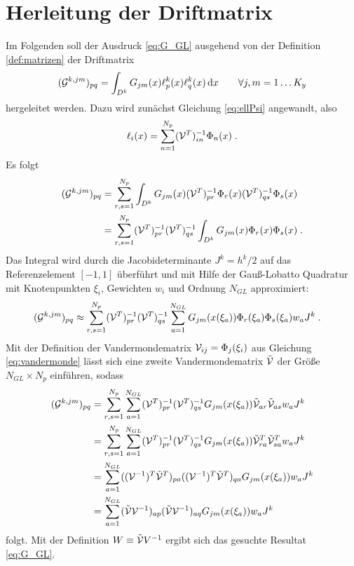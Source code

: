 \section{Herleitung der Driftmatrix}\label{sec:A_5}
Im Folgenden soll der Ausdruck \eqref{eq:G_GL} ausgehend von der Definition \ref{def:matrizen} der Driftmatrix
\begin{equation*}
  (\drift^{k,jm})_{pq} = \int_{D^k} G_{jm}(x) \ell_p^k(x) \ell_q^k(x) \diff x \qquad \forall j,m=1\dots K_y %
\end{equation*}
hergeleitet werden. Dazu wird zunächst Gleichung \eqref{eq:ellPsi} angewandt, also
\begin{equation*}
  \ell_i(x) = \sum_{n=1}^{N_p} (\mathcal{V}^T)^{-1}_{in}\Phi_n(x) \; .
\end{equation*}
Es folgt
\begin{align*}
    (\mathcal{G}^{k,jm})_{pq} &= \sum_{r,s=1}^{N_p}\int_{D^k} G_{jm}(x) (\mathcal{V}^T)^{-1}_{pr}\Phi_r(x) (\mathcal{V}^T)^{-1}_{qs}\Phi_s(x) \\
     &= \sum_{r,s=1}^{N_p} (\mathcal{V}^T)^{-1}_{pr} (\mathcal{V}^T)^{-1}_{qs}  \int_{D^k} G_{jm}(x) \Phi_r(x) \Phi_s(x) \; .
\end{align*}
Das Integral wird durch die Jacobideterminante $J^k=h^k/2$ auf das Referenzelement $[-1,1]$ überführt und mit Hilfe der Gauß-Lobatto Quadratur mit Knotenpunkten $\xi_i$, Gewichten $w_i$ und Ordnung $N_{GL}$ approximiert:
\begin{align*}
    (\mathcal{G}^{k,jm})_{pq} &\approx \sum_{r,s=1}^{N_p} (\mathcal{V}^T)^{-1}_{pr} (\mathcal{V}^T)^{-1}_{qs}  \sum_{a=1}^{N_{GL}} G_{jm}(x(\xi_a)) \Phi_r(\xi_a) \Phi_s(\xi_a) w_a J^k\; .
\end{align*}
Mit der Definition der Vandermondematrix $\mathcal{V}_{ij}=\Phi_j(\xi_i)$ aus Gleichung \eqref{eq:vandermonde} lässt sich eine zweite Vandermondematrix $\tilde{\mathcal{V}}$ der Größe $N_{GL}\times N_p$ einführen, sodass
\begin{align*}
  (\mathcal{G}^{k,jm})_{pq} &= \sum_{r,s=1}^{N_p}\sum_{a=1}^{N_{GL}} (\mathcal{V}^T)^{-1}_{pr} (\mathcal{V}^T)^{-1}_{qs}   G_{jm}(x(\xi_a)) \tilde{\mathcal{V}}_{ar} \tilde{\mathcal{V}}_{as} w_a J^k \\
  &= \sum_{r,s=1}^{N_p}\sum_{a=1}^{N_{GL}} (\mathcal{V}^T)^{-1}_{pr} (\mathcal{V}^T)^{-1}_{qs}   G_{jm}(x(\xi_a)) \tilde{\mathcal{V}}_{ra}^T \tilde{\mathcal{V}}_{sa}^T w_a J^k \\
  &= \sum_{a=1}^{N_{GL}} ((\mathcal{V}^{-1})^T \tilde{\mathcal{V}}^T)_{pa} ((\mathcal{V}^{-1})^T \tilde{\mathcal{V}}^T)_{qa}   G_{jm}(x(\xi_a))   w_a J^k \\
  &= \sum_{a=1}^{N_{GL}} (\tilde{\mathcal{V}} \mathcal{V}^{-1})_{ap} (\tilde{\mathcal{V}} \mathcal{V}^{-1})_{aq}   G_{jm}(x(\xi_a))   w_a J^k
\end{align*}
folgt. Mit der Definition $W\equiv\tilde{\mathcal{V}}V^{-1}$ ergibt sich das gesuchte Resultat \eqref{eq:G_GL}.
